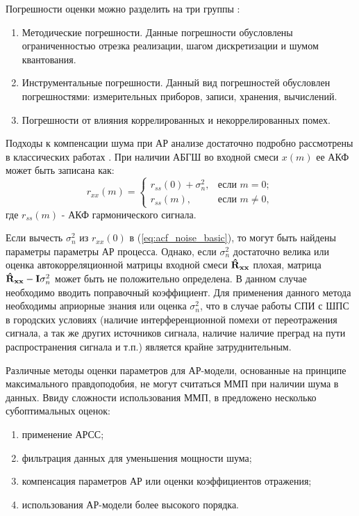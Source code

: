 Погрешности оценки можно разделить на три группы \cite{bolshakov-book}:
\begin{enumerate}
	\item Методические погрешности. Данные погрешности обусловлены ограниченностью отрезка реализации, шагом дискретизации и шумом квантования.
	\item Инструментальные погрешности. Данный вид погрешностей обусловлен погрешностями: измерительных приборов, записи, хранения, вычислений.
	\item Погрешности от влияния коррелированных и некоррелированных помех.
\end{enumerate}

Подходы к компенсации шума при АР анализе достаточно подробно рассмотрены в классических работах \cite{kay_ar_book, kay_noise_compensation}.
При наличии АБГШ во входной смеси ${x(m)}$ ее АКФ может быть записана как:
\begin{equation}
	\label{eq:acf_noise_basic}
	r_{xx}(m) =	\begin{cases}
				r_{ss}(0) + \sigma_n^2, & \mbox{если } m=0; \\
				r_{ss}(m), & \mbox{если } m \ne 0,
			\end{cases}
\end{equation}
где ${r_{ss}(m)}$ - АКФ гармонического сигнала.

Если вычесть ${\sigma_n^2}$ из ${r_{xx}(0)}$ в (\ref{eq:acf_noise_basic}), то могут быть найдены параметры параметры АР процесса. Однако, если ${\sigma_n^2}$ достаточно велика или 
оценка автокорреляционной матрицы входной смеси ${{\bf{\hat{R}_{xx}}}}$ плохая, матрица ${{\bf{\hat{R}_{xx}}} - {\bf{I}}\sigma_n^2}$ может быть не положительно определена. В данном
случае необходимо вводить поправочный коэффициент. Для применения данного метода необходимы априорные знания или оценка ${\sigma_n^2}$,
что в случае работы СПИ с ШПС в городских условиях (наличие интерференционной помехи от переотражения сигнала, а так же других источников сигнала,
наличие наличие преград на пути распространения сигнала и т.п.) является крайне затруднительным.

Различные методы оценки параметров для АР-модели, основанные на принципе максимального правдоподобия, не
могут считаться ММП при наличии шума в данных. Ввиду сложности использования ММП, в \cite{marpl_book, kay_ar_book} предложено несколько 
субоптимальных оценок:
\begin{enumerate}
	\item применение АРСС;
	\item фильтрация данных для уменьшения мощности шума;
	\item компенсация параметров АР или оценки коэффициентов отражения;
	\item использования АР-модели более высокого порядка.
\end{enumerate}

